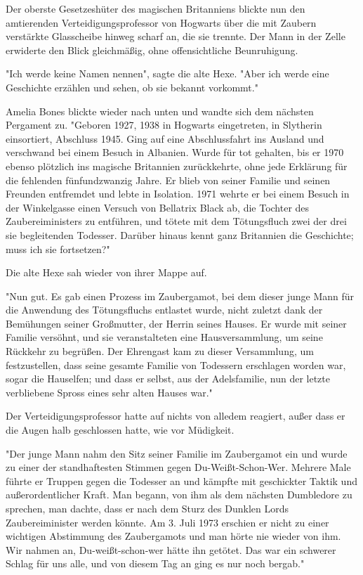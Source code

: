 {Der oberste Gesetzeshüter des magischen Britanniens blickte nun den amtierenden Verteidigungsprofessor von Hogwarts über die mit Zaubern verstärkte Glasscheibe hinweg scharf an, die sie trennte. Der Mann in der Zelle erwiderte den Blick gleichmäßig, ohne offensichtliche Beunruhigung.

"Ich werde keine Namen nennen", sagte die alte Hexe. "Aber ich werde eine Geschichte erzählen und sehen, ob sie bekannt vorkommt."

Amelia Bones blickte wieder nach unten und wandte sich dem nächsten Pergament zu. "Geboren 1927, 1938 in Hogwarts eingetreten, in Slytherin einsortiert, Abschluss 1945. Ging auf eine Abschlussfahrt ins Ausland und verschwand bei einem Besuch in Albanien. Wurde für tot gehalten, bis er 1970 ebenso plötzlich ins magische Britannien zurückkehrte, ohne jede Erklärung für die fehlenden fünfundzwanzig Jahre. Er blieb von seiner Familie und seinen Freunden entfremdet und lebte in Isolation. 1971 wehrte er bei einem Besuch in der Winkelgasse einen Versuch von Bellatrix Black ab, die Tochter des Zaubereiministers zu entführen, und tötete mit dem Tötungsfluch zwei der drei sie begleitenden Todesser. Darüber hinaus kennt ganz Britannien die Geschichte; muss ich sie fortsetzen?"

Die alte Hexe sah wieder von ihrer Mappe auf.

"Nun gut. Es gab einen Prozess im Zaubergamot, bei dem dieser junge Mann für die Anwendung des Tötungsfluchs entlastet wurde, nicht zuletzt dank der Bemühungen seiner Großmutter, der Herrin seines Hauses. Er wurde mit seiner Familie versöhnt, und sie veranstalteten eine Hausversammlung, um seine Rückkehr zu begrüßen. Der Ehrengast kam zu dieser Versammlung, um festzustellen, dass seine gesamte Familie von Todessern erschlagen worden war, sogar die Hauselfen; und dass er selbst, aus der Adelsfamilie, nun der letzte verbliebene Spross eines sehr alten Hauses war."

Der Verteidigungsprofessor hatte auf nichts von alledem reagiert, außer dass er die Augen halb geschlossen hatte, wie vor Müdigkeit.

"Der junge Mann nahm den Sitz seiner Familie im Zaubergamot ein und wurde zu einer der standhaftesten Stimmen gegen Du-Weißt-Schon-Wer. Mehrere Male führte er Truppen gegen die Todesser an und kämpfte mit geschickter Taktik und außerordentlicher Kraft. Man begann, von ihm als dem nächsten Dumbledore zu sprechen, man dachte, dass er nach dem Sturz des Dunklen Lords Zaubereiminister werden könnte. Am 3. Juli 1973 erschien er nicht zu einer wichtigen Abstimmung des Zaubergamots und man hörte nie wieder von ihm. Wir nahmen an, Du-weißt-schon-wer hätte ihn getötet. Das war ein schwerer Schlag für uns alle, und von diesem Tag an ging es nur noch bergab."

}
